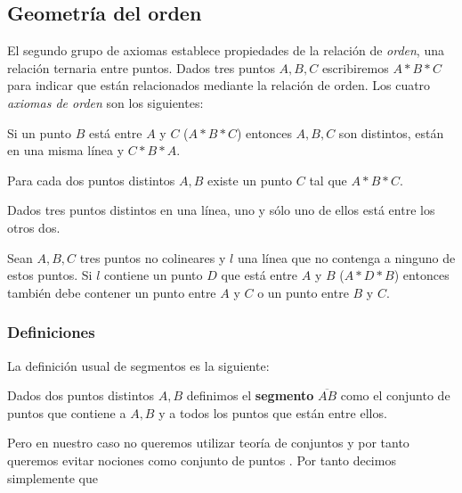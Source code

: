 \subsection{Geometría del orden}

El segundo grupo de axiomas establece propiedades de la relación de
\textit{orden}, una relación ternaria entre puntos. Dados tres puntos $A, B, C$
escribiremos $A * B * C$ para indicar que están relacionados mediante la
relación de orden.
Los cuatro \textit{axiomas de orden} son los siguientes:

\begin{ax}\label{ax:B1}
	Si un punto $B$ está entre $A$ y $C$ ($A * B * C$) entonces $A, B, C$ son
	distintos, están en una misma línea y $C * B * A$.
\end{ax}

\begin{ax}\label{ax:B2}
	Para cada dos puntos distintos $A,B$ existe un punto $C$ tal que $A * B * C$.
\end{ax}

\begin{ax}\label{ax:3}
	Dados tres puntos distintos en una línea, uno y sólo uno de ellos está entre
	los otros dos.
\end{ax}

\begin{ax}[Pasch]\label{ax:4}
	Sean $A, B, C$ tres puntos no colineares y $l$ una línea que no contenga a
	ninguno de estos puntos. Si $l$ contiene un punto $D$ que está entre $A$ y $B$
	($A * D * B$) entonces también debe contener un punto entre $A$ y $C$ o un
	punto entre $B$ y $C$.
\end{ax}



\subsubsection{Definiciones}

La definición usual de segmentos es la siguiente:

\begin{defin*}[Segmentos]
	Dados dos puntos distintos $A, B$ definimos el \textbf{segmento}
	$\overline{AB}$ como el conjunto de puntos que contiene a $A, B$ y a todos los
	puntos que están entre ellos.
\end{defin*}

Pero en nuestro caso no queremos utilizar teoría de conjuntos y por tanto
queremos evitar nociones como \guillemotleft conjunto de puntos \guillemotright.
Por tanto decimos simplemente que


